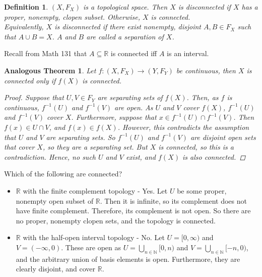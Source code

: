 \documentclass[11pt]{article}
\newtheorem{definition}{Definition}
\newtheorem{anagtheorem}{Analogous Theorem}
\begin{document}
\begin{definition}
$(X,F_X)$ is a topological space.  Then $X$ is disconnected if $X$ has a proper, nonempty, clopen subset.  Otherwise, $X$ is connected.
\\
Equivalently, $X$ is disconnected if there exist nonempty, disjoint $A,B \in F_X$ such that $A \cup B = X$.  $A$ and $B$ are called a separation of $X$.
\\
\end{definition}
\noindent Recall from Math 131 that $A \subseteq \mathbb{R}$ is connected iff $A$ is an interval.
\\
\begin{anagtheorem}
Let $f : (X,F_X) \to (Y,F_Y)$ be continuous, then $X$ is connected only if $f(X)$ is connected.
\begin{proof}
Suppose that $U,V \in F_Y$ are separating sets of $f(X)$.  Then, as $f$ is continuous, $f^{-1}(U)$ and $f^{-1}(V)$ are open.  As $U$ and $V$ cover $f(X)$, $f^{-1}(U)$ and $f^{-1}(V)$ cover $X$.  Furthermore, suppose that $x \in f^{-1}(U) \cap f^{-1}(V)$.  Then $f(x) \in U \cap V$, and $f(x) \in f(X)$.  However, this contradicts the assumption that $U$ and $V$ are separating sets.  So $f^{-1}(U)$ and $f^{-1}(V)$ are disjoint open sets that cover $X$, so they are a separating set.  But $X$ is connected, so this is a contradiction.  Hence, no such $U$ and $V$ exist, and $f(X)$ is also connected.
\end{proof}
\end{anagtheorem}
\vspace{.2in}
\noindent Which of the following are connected?
\begin{itemize}
\item $\mathbb{R}$ with the finite complement topology - Yes.  Let $U$ be some proper, nonempty open subset of $\mathbb{R}$.  Then it is infinite, so its complement does not have finite complement.  Therefore, its complement is not open.  So there are no proper, nonempty clopen sets, and the topology is connected.
\item $\mathbb{R}$ with the half-open interval topology - No.  Let $U = [0,\infty)$ and $V = (-\infty,0)$.  These are open as $U = \bigcup_{n\in \mathbb{N}} [0,n)$ and $V = \bigcup_{n \in \mathbb{N}} [-n,0)$, and the arbitrary union of basis elements is open.  Furthermore, they are clearly disjoint, and cover $\mathbb{R}$.\\
\end{itemize}
\end{document}
